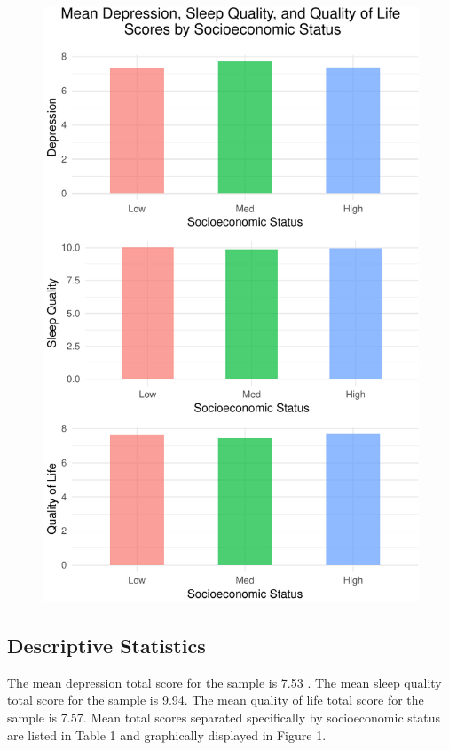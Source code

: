 \documentclass[man, noextraspace]{apa6}
\theoremstyle{definition}
\theoremstyle{definition}
\theoremstyle{definition}
\theoremstyle{remark}
\begin{document}
\begin{figure}
\centering
\includegraphics{APA_Document_files/figure-latex/plot 1-1.pdf}
\caption{}
\end{figure}

\subsection{Descriptive Statistics}\label{descriptive-statistics}

The mean depression total score for the sample is 7.53 . The mean sleep
quality total score for the sample is 9.94. The mean quality of life
total score for the sample is 7.57. Mean total scores separated
specifically by socioeconomic status are listed in Table 1 and
graphically displayed in Figure 1.
\end{document}
